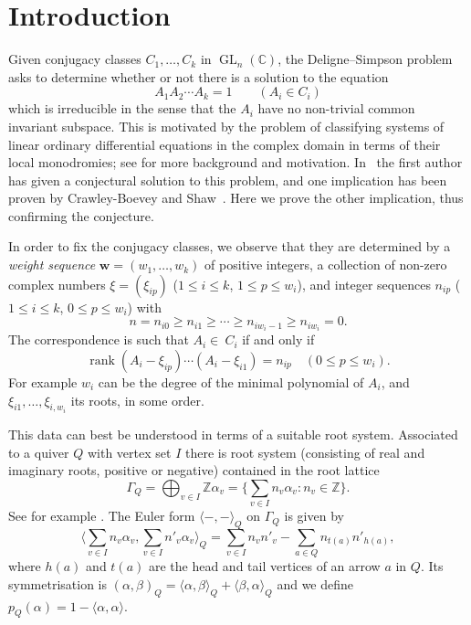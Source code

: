 \documentclass[12pt,a4paper]{amsart}
\theoremstyle{plain}
\newcommand{\C}{\mathbb C}
\newcommand{\Z}{\mathbb Z}
\DeclareMathOperator{\GL}{GL}
\DeclareMathOperator{\rank}{rank}
\newcommand{\bw}{\mathbf w}
\begin{document}
\section{Introduction}
Given conjugacy classes $C_1,\dots,C_k$ in $\GL_n(\C)$, the Deligne--Simpson problem asks to determine whether or not there is a solution to the equation
\[ A_1 A_2 \cdots A_k = 1 \qquad (A_i \in C_i) \]
which is irreducible in the sense that the $A_i$ have no non-trivial common invariant subspace. This is motivated by the problem of classifying systems of linear ordinary differential equations in the complex domain in terms of their local monodromies; see \cite{Kostovsurvey} for more background and motivation. In~\cite{CBipb} the first author has given a conjectural solution to this problem, and one implication has been proven by Crawley-Boevey and Shaw~\cite{CBSh}. Here we prove the other implication, thus confirming the conjecture.


In order to fix the conjugacy classes, we observe that they are determined by a \emph{weight sequence} $\bw=(w_1,\dots,w_k)$ of positive integers, a collection of non-zero complex numbers $\xi = (\xi_{ip})$ ($1\le i\le k$, $1\le p\le w_i$), and integer sequences $n_{ip}$ ($1\leq i\leq k$, $0\leq p\leq w_i$) with 
\[ n = n_{i0} \geq n_{i1} \geq \cdots \geq n_{iw_i-1} \geq n_{iw_i} = 0. \]
The correspondence is such that $A_i\in\ C_i$ if and only if 
\[ \rank(A_i-\xi_{ip})\cdots(A_i-\xi_{i1}) = n_{ip} \quad (0\leq p\leq w_i). \]
For example $w_i$ can be the degree of the minimal polynomial of $A_i$, and $\xi_{i1},\dots,\xi_{i,w_i}$ its roots, in some order.

This data can best be understood in terms of a suitable root system. Associated to a quiver $Q$ with vertex set $I$ there is root system (consisting of real and imaginary roots, 
positive or negative) contained in the root lattice
\[
\Gamma_Q = \bigoplus_{v\in I} \Z \alpha_v = \{ \sum_{v\in I} n_v \alpha_v : n_v\in \Z \}.
\]
See for example \cite{Kacm}. The Euler form $\langle-,-\rangle_Q$ on $\Gamma_Q$ is given by
\[
\langle \sum_{v\in I} n_v \alpha_v, \sum_{v\in I} n'_v \alpha_v \rangle_Q = \sum_{v\in I} n_v n'_v - \sum_{a\in Q} n_{t(a)} n'_{h(a)},
\]
where $h(a)$ and $t(a)$ are the head and tail vertices of an arrow $a$ in $Q$. Its symmetrisation is $(\alpha,\beta)_Q=\langle\alpha,\beta\rangle_Q+\langle\beta,\alpha\rangle_Q$ and we define $p_Q(\alpha)=1-\langle\alpha,\alpha\rangle$.
\end{document}
